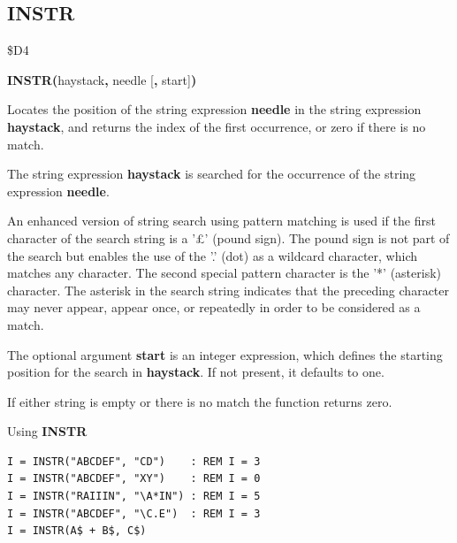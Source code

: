 \subsection{INSTR}
\begin{description}[leftmargin=2cm,style=nextline]
\item [Token:]    \$D4

\item [Format:]   {\bf INSTR(}haystack{\bf,} needle [{\bf,} start]{\bf)}

\item [Usage:]    Locates the position of the string expression {\bf needle} in the string expression {\bf haystack}, and returns the index of the first occurrence, or zero if there is no match.

                  The string expression {\bf haystack} is searched for the occurrence of the string expression {\bf needle}.

                  An enhanced version of string search using pattern matching is used if the first character of the search string is a '£' (pound sign). The pound sign is not part of the search but enables the use of the '.' (dot) as a wildcard character, which matches any character. The second special pattern character is the '*' (asterisk) character. The asterisk in the search string indicates that the preceding character may never appear, appear once, or repeatedly in order to be considered as a match.

                  The optional argument {\bf start} is an integer expression, which defines the starting position for the search in {\bf haystack}. If not present, it defaults to one.

\item [Remarks:]  If either string is empty or there is no match the function returns zero.

\item [Examples:] Using {\bf INSTR}

\begin{tcolorbox}[colback=black,coltext=white]
\verbatimfont{\codefont}
\begin{verbatim}
I = INSTR("ABCDEF", "CD")    : REM I = 3
I = INSTR("ABCDEF", "XY")    : REM I = 0
I = INSTR("RAIIIN", "\A*IN") : REM I = 5
I = INSTR("ABCDEF", "\C.E")  : REM I = 3
I = INSTR(A$ + B$, C$)
\end{verbatim}
\end{tcolorbox}
\end{description}

